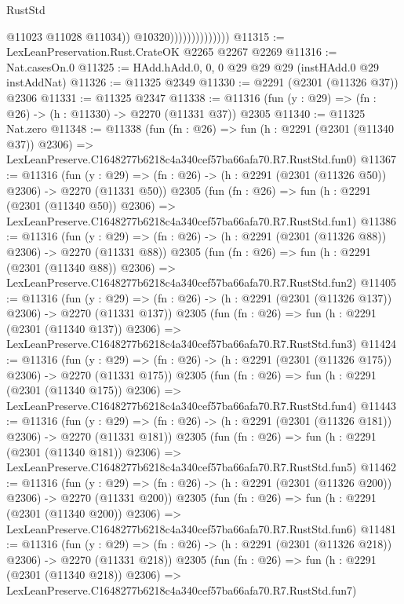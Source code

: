 \begin{lexlean}{RustStd}
\begin{coremodule}
                                    @11023
                                    @11028
                                    @11034))
                                @10320))))))))))))))
@11315 := LexLeanPreservation.Rust.CrateOK @2265 @2267 @2269
@11316 := Nat.casesOn.{0}
@11325 := HAdd.hAdd.{0, 0, 0} @29 @29 @29 (instHAdd.{0} @29 instAddNat)
@11326 := @11325 @2349
@11330 := @2291 (@2301 (@11326 @37)) @2306
@11331 := @11325 @2347
@11338 := @11316 (fun (y : @29) => (fn : @26) -> (h : @11330) -> @2270 (@11331 @37)) @2305
@11340 := @11325 Nat.zero
@11348 := @11338
    (fun (fn : @26) =>
    fun (h : @2291 (@2301 (@11340 @37)) @2306) =>
    LexLeanPreserve.C1648277b6218c4a340cef57ba66afa70.R7.RustStd.fun0)
@11367 := @11316
    (fun (y : @29) => (fn : @26) -> (h : @2291 (@2301 (@11326 @50)) @2306) -> @2270 (@11331 @50))
    @2305
    (fun (fn : @26) =>
    fun (h : @2291 (@2301 (@11340 @50)) @2306) =>
    LexLeanPreserve.C1648277b6218c4a340cef57ba66afa70.R7.RustStd.fun1)
@11386 := @11316
    (fun (y : @29) => (fn : @26) -> (h : @2291 (@2301 (@11326 @88)) @2306) -> @2270 (@11331 @88))
    @2305
    (fun (fn : @26) =>
    fun (h : @2291 (@2301 (@11340 @88)) @2306) =>
    LexLeanPreserve.C1648277b6218c4a340cef57ba66afa70.R7.RustStd.fun2)
@11405 := @11316
    (fun (y : @29) => (fn : @26) -> (h : @2291 (@2301 (@11326 @137)) @2306) -> @2270 (@11331 @137))
    @2305
    (fun (fn : @26) =>
    fun (h : @2291 (@2301 (@11340 @137)) @2306) =>
    LexLeanPreserve.C1648277b6218c4a340cef57ba66afa70.R7.RustStd.fun3)
@11424 := @11316
    (fun (y : @29) => (fn : @26) -> (h : @2291 (@2301 (@11326 @175)) @2306) -> @2270 (@11331 @175))
    @2305
    (fun (fn : @26) =>
    fun (h : @2291 (@2301 (@11340 @175)) @2306) =>
    LexLeanPreserve.C1648277b6218c4a340cef57ba66afa70.R7.RustStd.fun4)
@11443 := @11316
    (fun (y : @29) => (fn : @26) -> (h : @2291 (@2301 (@11326 @181)) @2306) -> @2270 (@11331 @181))
    @2305
    (fun (fn : @26) =>
    fun (h : @2291 (@2301 (@11340 @181)) @2306) =>
    LexLeanPreserve.C1648277b6218c4a340cef57ba66afa70.R7.RustStd.fun5)
@11462 := @11316
    (fun (y : @29) => (fn : @26) -> (h : @2291 (@2301 (@11326 @200)) @2306) -> @2270 (@11331 @200))
    @2305
    (fun (fn : @26) =>
    fun (h : @2291 (@2301 (@11340 @200)) @2306) =>
    LexLeanPreserve.C1648277b6218c4a340cef57ba66afa70.R7.RustStd.fun6)
@11481 := @11316
    (fun (y : @29) => (fn : @26) -> (h : @2291 (@2301 (@11326 @218)) @2306) -> @2270 (@11331 @218))
    @2305
    (fun (fn : @26) =>
    fun (h : @2291 (@2301 (@11340 @218)) @2306) =>
    LexLeanPreserve.C1648277b6218c4a340cef57ba66afa70.R7.RustStd.fun7)

\end{coremodule}
\end{lexlean}

